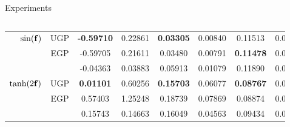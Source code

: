 \documentclass[final]{beamer}
\newlength{\sepwid}
\newlength{\onecolwid}
\newlength{\twocolwid}
\begin{document}
\begin{frame}[t]
\begin{columns}[t]
\begin{column}{\twocolwid}
\begin{columns}[t,totalwidth=\twocolwid]
\begin{column}{\twocolwid}
\begin{block}{Experiments}
\begin{columns}
\begin{table}[tb]
\begin{tabular}{r|c| c c c c c c}
        \midrule
        $\sin\!\left({\mathbf{f}}\right)$ 
& UGP & \textbf{-0.59710} & 0.22861 & \textbf{0.03305} & 0.00840 & 0.11513 & 0.00521 \\
& EGP & -0.59705 & 0.21611 & 0.03480 & 0.00791 & \textbf{0.11478} & 0.00532 \\
& \cite{Opper2009} & -0.04363 & 0.03883 & 0.05913 & 0.01079 & 0.11890 & 0.00652 \\
        \midrule
        $\tanh\!\left({2\mathbf{f}}\right)$
& UGP & \textbf{0.01101} & 0.60256 & \textbf{0.15703} & 0.06077 & \textbf{0.08767} & 0.00292 \\
& EGP & 0.57403 & 1.25248 & 0.18739 & 0.07869 & 0.08874 & 0.00394 \\
& \cite{Opper2009} & 0.15743 & 0.14663 & 0.16049 & 0.04563 & 0.09434 & 0.00425 \\
        \bottomrule
    \end{tabular}
    \label{tab:toy}
\end{table}

\column{0.5\twocolwid}

\end{columns}
\end{block}


\end{column} %









\end{columns} %

\end{column} %

\begin{column}{\sepwid}\end{column} %

\begin{column}{\onecolwid} %



\end{column}
\end{columns}
\end{frame}
\end{document}
